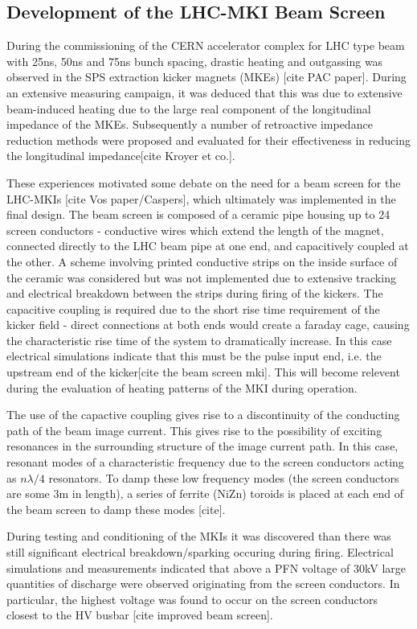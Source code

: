 \subsection{Development of the LHC-MKI Beam Screen}

During the commissioning of the CERN accelerator complex for LHC type beam with 25ns, 50ns and 75ns bunch spacing, drastic heating and outgassing was observed in the SPS extraction kicker magnets (MKEs) [cite PAC paper]. During an extensive measuring campaign, it was deduced that this was due to extensive beam-induced heating due to the large real component of the longitudinal impedance of the MKEs. Subsequently a number of retroactive impedance reduction methods were proposed and evaluated for their effectiveness in reducing the longitudinal impedance[cite Kroyer et co.].

These experiences motivated some debate on the need for a beam screen for the LHC-MKIs [cite Vos paper/Caspers], which ultimately was implemented in the final design. The beam screen is composed of a ceramic pipe housing up to 24 screen conductors - conductive wires which extend the length of the magnet, connected directly to the LHC beam pipe at one end, and capacitively coupled at the other. A scheme involving printed conductive strips on the inside surface of the ceramic was considered but was not implemented due to extensive tracking and electrical breakdown between the strips during firing of the kickers. The capacitive coupling is required due to the short rise time requirement of the kicker field - direct connections at both ends would create a faraday cage, causing the characteristic rise time of the system to dramatically increase. In this case electrical simulations indicate that this must be the pulse input end, i.e. the upstream end of the kicker[cite the beam screen mki]. This will become relevent during the evaluation of heating patterns of the MKI during operation.

The use of the capactive coupling gives rise to a discontinuity of the conducting path of the beam image current. This gives rise to the possibility of exciting resonances in the surrounding structure of the image current path. In this case, resonant modes of a characteristic frequency due to the screen conductors acting as $n \lambda /4$ resonators. To damp these low frequency modes (the screen conductors are some 3m in length), a series of ferrite (NiZn) toroids is placed at each end of the beam screen to damp these modes [cite]. 

During testing and conditioning of the MKIs it was discovered than there was still significant electrical breakdown/sparking occuring during firing. Electrical simulations and measurements indicated that above a PFN voltage of 30kV large quantities of discharge were observed originating from the screen conductors. In particular, the highest voltage was found to occur on the screen conductors closest to the HV busbar [cite improved beam screen].
